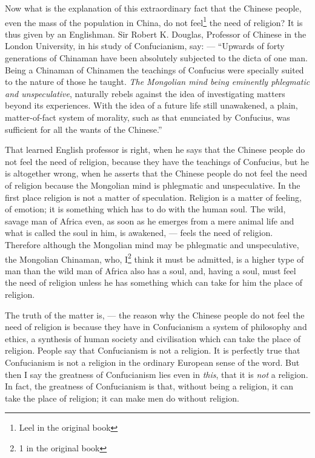 Now what is the explanation of this extraordinary fact that the Chinese people, even the mass of the population in China, do not feel\footnote{Leel in the original book} the need of religion?
It is thus given by an Englishman.  
Sir Robert K. Douglas, Professor of Chinese in the London University, in his study of Confucianism, say:  --- ``Upwards of forty generations of Chinaman have been absolutely subjected to the dicta of one man. 
Being a Chinaman of Chinamen the teachings of Confucius were specially suited to the nature of those he taught. 
\emph{The Mongolian  mind being eminently phlegmatic and unspeculative}, naturally rebels against the idea of investigating matters beyond its experiences. 
With the idea of a future life still unawakened, a plain, matter-of-fact system of morality, such as that enunciated by Confucius, was sufficient for all the wants of the Chinese.''

That learned English professor is right, when he says that the Chinese people do not feel the need of religion, because they have the teachings of Confucius, but he is altogether wrong, when he asserts that the Chinese people do not feel the need of religion because the Mongolian mind is phlegmatic and unspeculative. 
In the first place religion is not a matter of speculation.
Religion is a matter of feeling, of emotion; it is something which has to do with the human soul.
The wild, savage man of Africa even, as soon as he emerges from a mere animal life and what is called the soul in him, is awakened, --- feels the need of religion.
Therefore although the Mongolian mind may be phlegmatic and unspeculative, the Mongolian Chinaman, who, I\footnote{1 in the original book} think it must be admitted, is a higher type of man than the wild man of Africa also has a soul, and, having a soul, must feel the need of religion unless he has something which can take for him the place of religion.

The truth of the matter is, --- the reason why the Chinese people do not feel the need of religion is because they have in Confucianism a system of philosophy and ethics, a synthesis of human society and civilisation which can take the place of religion.
People say that Confucianism is not a religion.
It is perfectly true that Confucianism is not a religion in the ordinary European sense of the word.
But then I say the greatness of Confucianism lies even in \emph{this}, that it is \emph{not} a religion.
In fact, the greatness of Confucianism is that, without being a religion, it can take the place of religion; it can make men do without religion.

